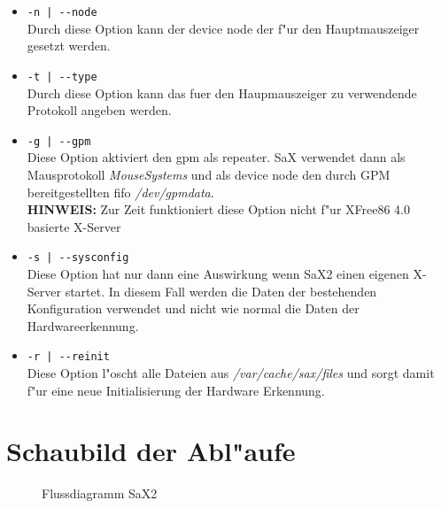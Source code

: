 \begin{itemize}
\item \verb+-n | --node+\\  
      Durch diese Option kann der device node der f"ur den 
      Hauptmauszeiger gesetzt werden.

\item \verb+-t | --type+\\
      Durch diese Option kann das fuer den Haupmauszeiger zu 
      verwendende Protokoll angeben werden.

\item \verb+-g | --gpm+\\
      Diese Option aktiviert den gpm als repeater. SaX verwendet 
      dann als Mausprotokoll \textit{MouseSystems} und als 
      device node den durch GPM bereitgestellten fifo 
      \textit{/dev/gpmdata}.\\
      \textbf{HINWEIS:} Zur Zeit funktioniert diese Option nicht 
      f"ur XFree86 4.0 basierte X-Server

\item \verb+-s | --sysconfig+\\
      Diese Option hat nur dann eine Auswirkung wenn SaX2 einen
      eigenen X-Server startet. In diesem Fall werden die Daten
      der bestehenden Konfiguration verwendet und nicht wie normal
      die Daten der Hardwareerkennung.

\item \verb+-r | --reinit+\\
      Diese Option l"oscht alle Dateien aus \textit{/var/cache/sax/files}
      und sorgt damit f"ur eine neue Initialisierung der Hardware
      Erkennung.

\end{itemize}

\newpage 
\section{Schaubild der Abl"aufe}

\begin{figure}[h]
\centering
{}
\caption{Flussdiagramm SaX2}
\end{figure}
